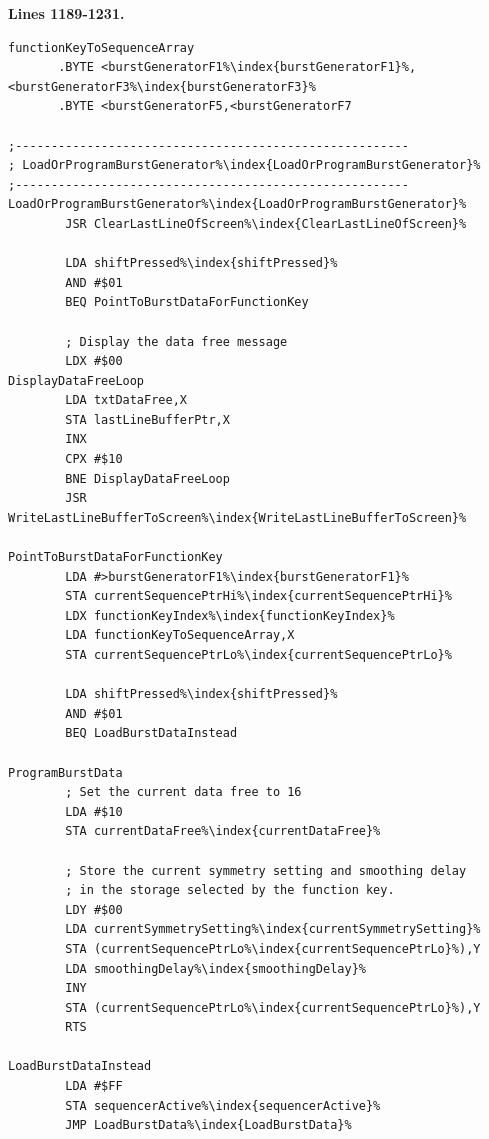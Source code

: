 \clearpage
\textbf{Lines 1189-1231. }
\begin{lstlisting}[basicstyle=\ttfamily\scriptsize,escapechar=\%]
functionKeyToSequenceArray
       .BYTE <burstGeneratorF1%\index{burstGeneratorF1}%,<burstGeneratorF3%\index{burstGeneratorF3}%
       .BYTE <burstGeneratorF5,<burstGeneratorF7

;-------------------------------------------------------
; LoadOrProgramBurstGenerator%\index{LoadOrProgramBurstGenerator}%
;-------------------------------------------------------
LoadOrProgramBurstGenerator%\index{LoadOrProgramBurstGenerator}%   
        JSR ClearLastLineOfScreen%\index{ClearLastLineOfScreen}%

        LDA shiftPressed%\index{shiftPressed}%
        AND #$01
        BEQ PointToBurstDataForFunctionKey

        ; Display the data free message
        LDX #$00
DisplayDataFreeLoop   
        LDA txtDataFree,X
        STA lastLineBufferPtr,X
        INX 
        CPX #$10
        BNE DisplayDataFreeLoop
        JSR WriteLastLineBufferToScreen%\index{WriteLastLineBufferToScreen}%

PointToBurstDataForFunctionKey   
        LDA #>burstGeneratorF1%\index{burstGeneratorF1}%
        STA currentSequencePtrHi%\index{currentSequencePtrHi}%
        LDX functionKeyIndex%\index{functionKeyIndex}%
        LDA functionKeyToSequenceArray,X
        STA currentSequencePtrLo%\index{currentSequencePtrLo}%

        LDA shiftPressed%\index{shiftPressed}%
        AND #$01
        BEQ LoadBurstDataInstead

ProgramBurstData
        ; Set the current data free to 16
        LDA #$10
        STA currentDataFree%\index{currentDataFree}%

        ; Store the current symmetry setting and smoothing delay
        ; in the storage selected by the function key. 
        LDY #$00
        LDA currentSymmetrySetting%\index{currentSymmetrySetting}%
        STA (currentSequencePtrLo%\index{currentSequencePtrLo}%),Y
        LDA smoothingDelay%\index{smoothingDelay}%
        INY 
        STA (currentSequencePtrLo%\index{currentSequencePtrLo}%),Y
        RTS 

LoadBurstDataInstead
        LDA #$FF
        STA sequencerActive%\index{sequencerActive}%
        JMP LoadBurstData%\index{LoadBurstData}%

\end{lstlisting}
\clearpage

